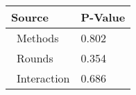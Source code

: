 
\centering
\begin{tabular}{ll}
\toprule
          Source & P-Value \\
\midrule
    \    Methods &   0.802 \\
     \    Rounds &   0.354 \\
\    Interaction &   0.686 \\
\bottomrule
\end{tabular}
